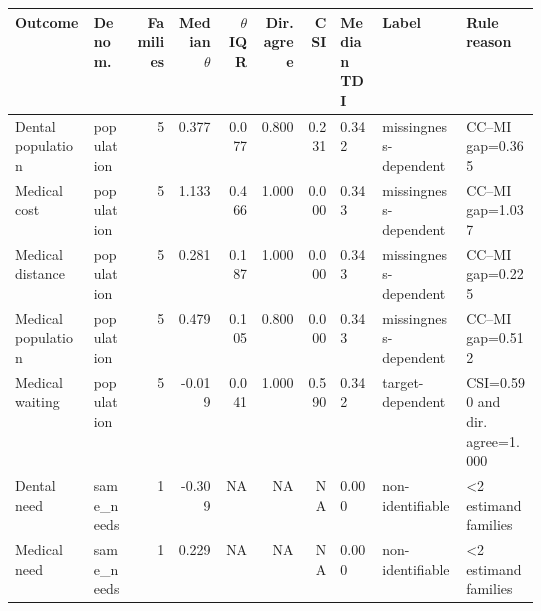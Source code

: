 \begingroup
\scriptsize
\setlength{\tabcolsep}{3pt}
\begin{tabularx}{\linewidth}{@{}p{0.15\linewidth}p{0.08\linewidth}rrrrrp{0.08\linewidth}p{0.16\linewidth}p{0.14\linewidth}@{}}
\toprule
Outcome & Denom. & Families & Median $\theta$ & $\theta$ IQR & Dir. agree & CSI & Median TDI & Label & Rule reason \\
\midrule
Dental population & population & 5 & 0.377 & 0.077 & 0.800 & 0.231 & 0.342 & missingness-dependent & CC--MI gap=0.365 \\
Medical cost & population & 5 & 1.133 & 0.466 & 1.000 & 0.000 & 0.343 & missingness-dependent & CC--MI gap=1.037 \\
Medical distance & population & 5 & 0.281 & 0.187 & 1.000 & 0.000 & 0.343 & missingness-dependent & CC--MI gap=0.225 \\
Medical population & population & 5 & 0.479 & 0.105 & 0.800 & 0.000 & 0.343 & missingness-dependent & CC--MI gap=0.512 \\
Medical waiting & population & 5 & -0.019 & 0.041 & 1.000 & 0.590 & 0.342 & target-dependent & CSI=0.590 and dir. agree=1.000 \\
Dental need & same\_needs & 1 & -0.309 & NA & NA & NA & 0.000 & non-identifiable & <2 estimand families \\
Medical need & same\_needs & 1 & 0.229 & NA & NA & NA & 0.000 & non-identifiable & <2 estimand families \\
\bottomrule
\end{tabularx}
\endgroup
